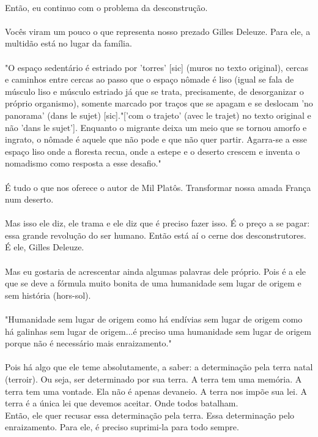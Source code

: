 \documentclass[10pt,a4paper]{book}
\begin{document}
	\\
	Então, eu continuo com o problema da desconstrução.\\
	\\
	Vocês viram um pouco o que representa nosso prezado Gilles Deleuze. Para ele, a multidão está no lugar da família.\\
	\\
	"O espaço sedentário é estriado por 'torres' [sic] (muros no texto original), cercas e caminhos entre cercas ao passo que o espaço nômade é liso (igual se fala de músculo liso e músculo estriado já que se trata, precisamente, de desorganizar o próprio organismo), somente marcado por traços que se apagam e se deslocam 'no panorama' (dans le sujet) [sic]."['com o trajeto' (avec le trajet)  no texto original e não 'dans le sujet']. Enquanto o migrante deixa um meio que se tornou amorfo e ingrato, o nômade é aquele que não pode e que não quer partir. Agarra-se a esse espaço liso onde a floresta recua, onde a estepe e o deserto crescem e inventa o nomadismo como resposta a esse desafio."\\
	\\
	É tudo o que nos oferece o autor de Mil Platôs. Transformar nossa amada França num deserto.\\
	\\
	Mas isso ele diz, ele trama e ele diz que é preciso fazer isso. É o preço a se pagar: essa grande revolução do ser humano. Então está aí o cerne dos desconstrutores. É ele, Gilles Deleuze.\\
	\\
	Mas eu gostaria de acrescentar ainda algumas palavras dele próprio. Pois é a ele que se deve a fórmula muito bonita de uma humanidade sem lugar de origem e sem história (hors-sol).\\
	\\
	"Humanidade sem lugar de origem como há endívias sem lugar de origem como há galinhas sem lugar de origem...é preciso uma humanidade sem lugar de origem porque não é necessário mais enraizamento."\\
	\\
	Pois há algo que ele teme absolutamente, a saber: a determinação pela terra natal (terroir). Ou seja, ser determinado por sua terra. A terra tem uma memória. A terra tem uma vontade. Ela não é apenas devaneio. A terra nos impõe sua lei. A terra é a única lei que devemos aceitar. Onde todos batalham.\\
	Então, ele quer recusar essa determinação pela terra. Essa determinação pelo enraizamento. Para ele, é preciso suprimi-la para todo sempre.\\
\end{document}
